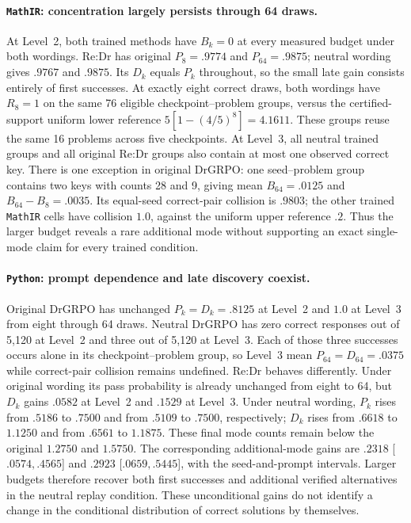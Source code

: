 \documentclass{article}
\newcommand{\1}{\mathbf 1}
\theoremstyle{remark}
\theoremstyle{definition}
\theoremstyle{plain}
\begin{document}
\paragraph{\texttt{MathIR}: concentration largely persists through 64 draws.}
At Level~2, both trained methods have $B_k=0$ at every measured budget under
both wordings. Re:Dr has original $P_8=.9774$ and $P_{64}=.9875$;
neutral wording gives $.9767$ and $.9875$. Its $D_k$ equals $P_k$ throughout,
so the small late gain consists entirely of first successes. At exactly eight
correct draws, both wordings have $R_8=1$ on the same 76 eligible
checkpoint--problem groups, versus the certified-support uniform lower
reference $5[1-(4/5)^8]=4.1611$. These groups reuse the same 16 problems
across five checkpoints. At Level~3, all neutral trained groups and all
original Re:Dr groups also contain at most one observed correct key.
There is one exception in original DrGRPO: one seed--problem group
contains two keys with counts 28 and 9, giving mean $B_{64}=.0125$ and
$B_{64}-B_8=.0035$. Its equal-seed correct-pair collision is $.9803$;
the other trained \texttt{MathIR} cells have collision $1.0$, against the uniform
upper reference $.2$. Thus the larger budget reveals a rare additional mode
without supporting an exact single-mode claim for every trained condition.

\paragraph{\texttt{Python}: prompt dependence and late discovery coexist.}
Original DrGRPO has unchanged $P_k=D_k=.8125$ at Level~2 and $1.0$ at
Level~3 from eight through 64 draws. Neutral DrGRPO has zero correct responses
out of 5,120 at Level~2 and three out of 5,120 at Level~3. Each of those
three successes occurs alone in its checkpoint--problem group, so Level~3
mean $P_{64}=D_{64}=.0375$ while correct-pair collision remains undefined.
Re:Dr behaves differently. Under original wording its pass probability
is already unchanged from eight to 64, but $D_k$ gains $.0582$ at Level~2
and $.1529$ at Level~3. Under neutral wording, $P_k$ rises from $.5186$ to
$.7500$ and from $.5109$ to $.7500$, respectively; $D_k$ rises from $.6618$
to $1.1250$ and from $.6561$ to $1.1875$. These final mode counts remain
below the original $1.2750$ and $1.5750$. The corresponding additional-mode
gains are $.2318$ [$.0574,.4565$] and $.2923$ [$.0659,.5445$], with the
seed-and-prompt intervals. Larger budgets therefore recover both
first successes and additional verified alternatives in the neutral replay
condition. These unconditional gains do not identify a change in the
conditional distribution of correct solutions by themselves.
\end{document}
